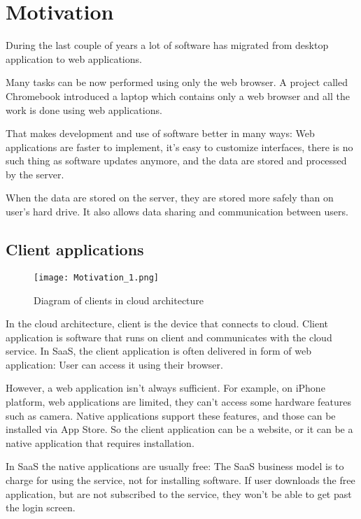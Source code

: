 \section{Motivation}

During the last couple of years a lot of software has migrated from desktop application to web applications.

Many tasks can be now performed using only the web browser. A project called Chromebook \citep{chromebook} introduced a laptop which contains only a web browser and all the work is done using web applications.

That makes development and use of software better in many ways: Web applications are faster to implement, it’s easy to customize interfaces, there is no such thing as software updates anymore, and the data are stored and processed by the server.

When the data are stored on the server, they are stored more safely than on user's hard drive. It also allows data sharing and communication between users.

\subsection{Client applications}

\begin{figure}[ht!]
\centering
\texttt{[image: Motivation\_1.png]}
\caption{Diagram of clients in cloud architecture \label{fig:1}}
\end{figure}

In the cloud architecture, client is the device that connects to cloud. Client application is software that runs on client and communicates with the cloud service. In SaaS, the client application is often delivered in form of web application: User can access it using their browser.

However, a web application isn't always sufficient. For example, on iPhone platform, web applications are limited, they can’t access some hardware features such as camera. Native applications support these features, and those can be installed via App Store. So the client application can be a website, or it can be a native application that requires installation.
 	
In SaaS the native applications are usually free: The SaaS business model is to charge  for using the service, not for installing software. If user downloads the free application, but are not subscribed to the service, they won't be able to get past the login screen. 

